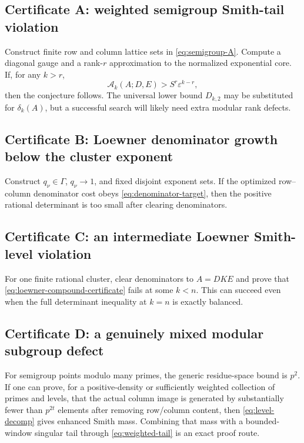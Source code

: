 \documentclass[11pt,oneside]{article}
\theoremstyle{definition}
\theoremstyle{remark}
\newcommand{\eps}{\varepsilon}
\begin{document}
\subsection{Certificate A: weighted semigroup Smith-tail violation}

Construct finite row and column lattice sets in \eqref{eq:semigroup-A}.  Compute a diagonal gauge and a rank-$r$ approximation to the normalized exponential core.  If, for any $k>r$,
\[
 \mathcal A_k(A;D,E)>S^r\eps^{k-r},
\]
then the conjecture follows.  The universal lower bound $D_{k,2}$ may be substituted for $\delta_k(A)$, but a successful search will likely need extra modular rank defects.

\subsection{Certificate B: Loewner denominator growth below the cluster exponent}

Construct $q_\nu\in\Gamma$, $q_\nu\to1$, and fixed disjoint exponent sets.  If the optimized row--column denominator cost obeys \eqref{eq:denominator-target}, then the positive rational determinant is too small after clearing denominators.

\subsection{Certificate C: an intermediate Loewner Smith-level violation}

For one finite rational cluster, clear denominators to $A=DK E$ and prove that \eqref{eq:loewner-compound-certificate} fails at some $k<n$.  This can succeed even when the full determinant inequality at $k=n$ is exactly balanced.

\subsection{Certificate D: a genuinely mixed modular subgroup defect}

For semigroup points modulo many primes, the generic residue-space bound is $p^2$.  If one can prove, for a positive-density or sufficiently weighted collection of primes and levels, that the actual column image is generated by substantially fewer than $p^{2t}$ elements after removing row/column content, then \eqref{eq:level-decomp} gives enhanced Smith mass.  Combining that mass with a bounded-window singular tail through \eqref{eq:weighted-tail} is an exact proof route.
\end{document}
